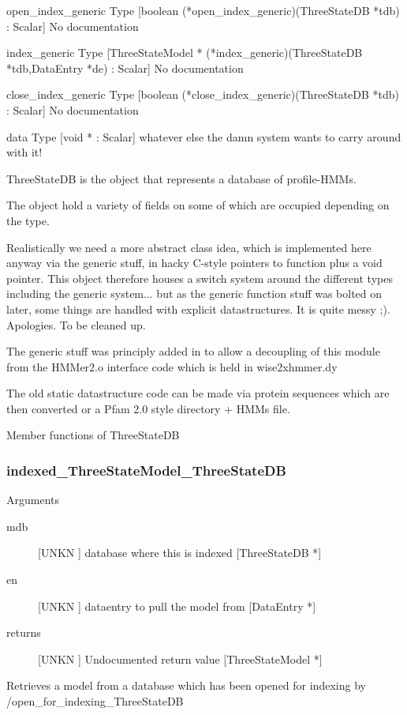 \begin{description}
\item{open_index_generic} Type [boolean (*open_index_generic)(ThreeStateDB *tdb) : Scalar] No documentation

\item{index_generic} Type [ThreeStateModel * (*index_generic)(ThreeStateDB *tdb,DataEntry *de) : Scalar] No documentation

\item{close_index_generic} Type [boolean (*close_index_generic)(ThreeStateDB *tdb) : Scalar] No documentation

\item{data} Type [void * : Scalar]  whatever else the damn system wants to carry around with it! 

\end{description}
ThreeStateDB is the object that represents
a database of profile-HMMs. 


The object hold a variety of fields on some of which are
occupied depending on the type.


Realistically we need a more abstract class idea, which is
implemented here anyway via the generic stuff, in hacky
C-style pointers to function plus a void pointer. This object
therefore houses a switch system around the different types
including the generic system... but as the generic function
stuff was bolted on later, some things are handled with
explicit datastructures. It is quite messy ;). Apologies.
To be cleaned up.


The generic stuff was principly added in to allow a decoupling of this module
from the HMMer2.o interface code which is held in wise2xhmmer.dy


The old static datastructure code can be 
made via protein sequences which are then converted or a 
Pfam 2.0 style directory + HMMs file.




Member functions of ThreeStateDB

\subsubsection{indexed_ThreeStateModel_ThreeStateDB}

Arguments
\begin{description}
\item[mdb] [UNKN ] database where this is indexed [ThreeStateDB *]
\item[en] [UNKN ] dataentry to pull the model from [DataEntry *]
\item[returns] [UNKN ] Undocumented return value [ThreeStateModel *]
\end{description}
Retrieves a model from a database which has been opened
for indexing by /open_for_indexing_ThreeStateDB


